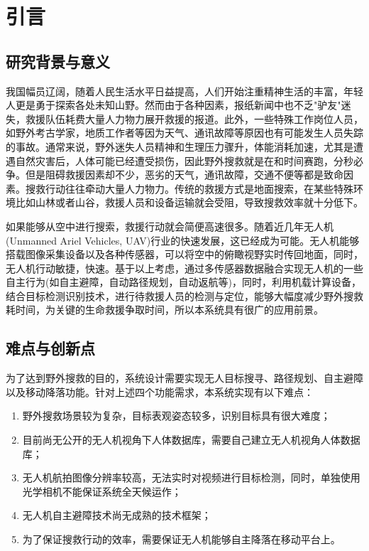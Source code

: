 \chapter{引言}
\thispagestyle{fancy}
\section{研究背景与意义}

我国幅员辽阔，随着人民生活水平日益提高，人们开始注重精神生活的丰富，年轻人更是勇于探索各处未知山野。然而由于各种因素，报纸新闻中也不乏"驴友"迷失，救援队伍耗费大量人力物力展开救援的报道。此外，一些特殊工作岗位人员，如野外考古学家，地质工作者等因为天气、通讯故障等原因也有可能发生人员失踪的事故。通常来说，野外迷失人员精神和生理压力骤升，体能消耗加速，尤其是遭遇自然灾害后，人体可能已经遭受损伤，因此野外搜救就是在和时间赛跑，分秒必争。但是阻碍救援因素却不少，恶劣的天气，通讯故障，交通不便等都是致命因素。搜救行动往往牵动大量人力物力。传统的救援方式是地面搜索，在某些特殊环境比如山林或者山谷，救援人员和设备运输就会受阻，导致搜救效率就十分低下。


如果能够从空中进行搜索，救援行动就会简便高速很多。随着近几年无人机(Unmanned Ariel Vehicles, UAV)行业的快速发展，这已经成为可能。无人机能够搭载图像采集设备以及各种传感器，可以将空中的俯瞰视野实时传回地面，同时，无人机行动敏捷，快速。基于以上考虑，通过多传感器数据融合实现无人机的一些自主行为(如自主避障，自动路径规划，自动返航等)，同时，利用机载计算设备，结合目标检测识别技术，进行待救援人员的检测与定位，能够大幅度减少野外搜救耗时间，为关键的生命救援争取时间，所以本系统具有很广的应用前景。




\section{难点与创新点}

为了达到野外搜救的目的，系统设计需要实现无人目标搜寻、路径规划、自主避障以及移动降落功能。针对上述四个功能需求，本系统实现有以下难点：
\begin{enumerate}[1.]
\item 野外搜救场景较为复杂，目标表观姿态较多，识别目标具有很大难度；
\item 目前尚无公开的无人机视角下人体数据库，需要自己建立无人机视角人体数据库；
\item 无人机航拍图像分辨率较高，无法实时对视频进行目标检测，同时，单独使用光学相机不能保证系统全天候运作；
\item 无人机自主避障技术尚无成熟的技术框架；
\item 为了保证搜救行动的效率，需要保证无人机能够自主降落在移动平台上。
\end{enumerate}



